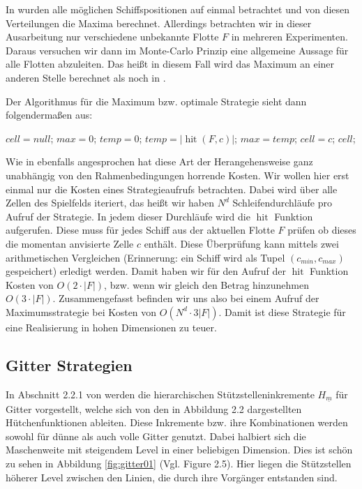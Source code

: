\documentclass[a4paper,12pt]{llncs}
\numberwithin{equation}{section}
\DeclareMathOperator{\hit}{hit}
\begin{document}
In \cite{M13} wurden alle möglichen Schiffspositionen auf einmal betrachtet und von diesen Verteilungen die Maxima berechnet. Allerdings betrachten wir in dieser Ausarbeitung nur verschiedene unbekannte Flotte $F$ in mehreren Experimenten. Daraus versuchen wir dann im Monte-Carlo Prinzip eine allgemeine Aussage für alle Flotten abzuleiten. Das heißt in diesem Fall wird das Maximum an einer anderen Stelle berechnet als noch in \cite{M13}. 

Der Algorithmus für die Maximum bzw. optimale Strategie sieht dann folgendermaßen aus:

\begin{tcolorbox}
	\begin{algorithmic}
		\State $cell = null$;
		\State $max = 0$;
		\State $temp = 0$;
		\State $temp=\left|\hit(F,c)\right|$;
		\State $max=temp$;
		\State $cell = c$;
		\EndIf
		\EndFor
		\State \Return $cell$;
		\EndFunction
	\end{algorithmic}
\end{tcolorbox}

Wie in \cite{M13} ebenfalls angesprochen hat diese Art der Herangehensweise ganz unabhängig von den Rahmenbedingungen horrende Kosten. Wir wollen hier erst einmal nur die Kosten eines Strategieaufrufs betrachten. Dabei wird über alle Zellen des Spielfelds iteriert, das heißt wir haben $N^d$ Schleifendurchläufe pro Aufruf der Strategie. In jedem dieser Durchläufe wird die $\hit$ Funktion aufgerufen. Diese muss für jedes Schiff aus der aktuellen Flotte $F$ prüfen ob dieses die momentan anvisierte Zelle $c$ enthält. Diese Überprüfung kann mittels zwei arithmetischen Vergleichen (Erinnerung: ein Schiff wird als Tupel $(c_{min},c_{max})$ gespeichert) erledigt werden. Damit haben wir für den Aufruf der $\hit$ Funktion Kosten von $O(2\cdot |F|)$, bzw. wenn wir gleich den Betrag hinzunehmen $O(3\cdot |F|)$. Zusammengefasst befinden wir uns also bei einem Aufruf der Maximumsstrategie bei Kosten von $O(N^d\cdot3|F|)$. Damit ist diese Strategie für eine Realisierung in hohen Dimensionen zu teuer. 

\subsection{Gitter Strategien}

In Abschnitt 2.2.1 von \cite{M13} werden die hierarchischen Stützstelleninkremente $H_{\underline{m}}$ für Gitter vorgestellt, welche sich von den in \cite{M13} Abbildung 2.2 dargestellten Hütchenfunktionen ableiten. Diese Inkremente bzw. ihre Kombinationen werden sowohl für dünne als auch volle Gitter genutzt. Dabei halbiert sich die Maschenweite mit steigendem Level in einer beliebigen Dimension. Dies ist schön zu sehen in Abbildung \ref{fig:gitter01} (Vgl. \cite{P10} Figure 2.5). Hier liegen die Stützstellen höherer Level zwischen den Linien, die durch ihre Vorgänger entstanden sind.
\end{document}
